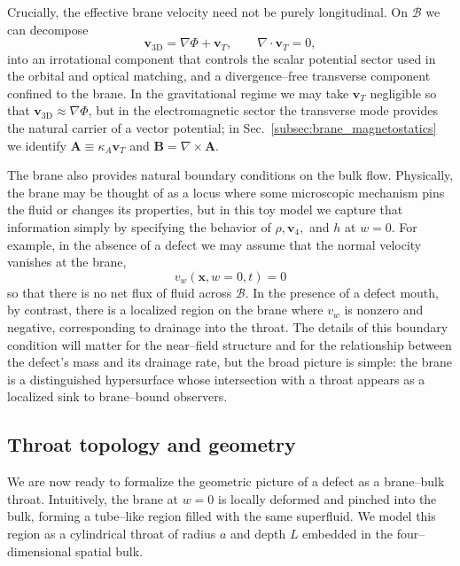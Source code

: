 \documentclass[12pt]{article}
\begin{document}
Crucially, the effective brane velocity need not be purely longitudinal.  On
$\mathcal{B}$ we can decompose
\begin{equation}
  \mathbf{v}_{\mathrm{3D}} = \nabla\Phi + \mathbf{v}_T,
  \qquad \nabla\cdot \mathbf{v}_T = 0,
  \label{eq:v3d_decomposition}
\end{equation}
into an irrotational component that controls the scalar potential sector used
in the orbital and optical matching, and a divergence--free transverse
component confined to the brane.  In the gravitational regime we may take
$\mathbf{v}_T$ negligible so that $\mathbf{v}_{\mathrm{3D}}\approx\nabla\Phi$,
but in the electromagnetic sector the transverse mode provides the natural
carrier of a vector potential; in Sec.~\ref{subsec:brane_magnetostatics} we
identify $\mathbf{A}\equiv\kappa_A \mathbf{v}_T$ and
$\mathbf{B}=\nabla\times\mathbf{A}$.



The brane also provides natural boundary conditions on the bulk flow.
Physically, the brane may be thought of as a locus where some microscopic
mechanism pins the fluid or changes its properties, but in this toy model we
capture that information simply by specifying the behavior of
$\rho, \mathbf{v}_4,$ and $h$ at $w=0$.  For example, in the absence of a
defect we may assume that the normal velocity vanishes at the brane,
\begin{equation}
  v_w(\mathbf{x},w=0,t) = 0
\end{equation}
so that there is no net flux of fluid across $\mathcal{B}$.  In the presence
of a defect mouth, by contrast, there is a localized region on the brane
where $v_w$ is nonzero and negative, corresponding to drainage into the
throat.  The details of this boundary condition will matter for the
near--field structure and for the relationship between the defect's mass and
its drainage rate, but the broad picture is simple: the brane is a
distinguished hypersurface whose intersection with a throat appears as a
localized sink to brane--bound observers.

\subsection{Throat topology and geometry}
\label{subsec:throat_geometry}

We are now ready to formalize the geometric picture of a defect as a
brane--bulk throat.  Intuitively, the brane at $w=0$ is locally deformed and
pinched into the bulk, forming a tube--like region filled with the same
superfluid.  We model this region as a cylindrical throat of radius $a$ and
depth $L$ embedded in the four--dimensional spatial bulk.
\end{document}
